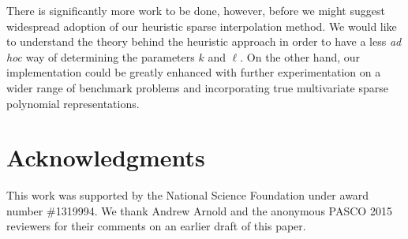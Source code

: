 \documentclass[letterpaper,10pt]{article}
\begin{document}
There is significantly more work to be done, however, before we might
suggest widespread adoption of our heuristic sparse interpolation
method. We would like to understand the theory behind the heuristic
approach in order to have a less \emph{ad hoc} way of determining the
parameters $k$ and $\ell$. On the other hand, our implementation could
be greatly enhanced with further experimentation on a wider range of
benchmark problems and incorporating true multivariate sparse polynomial
representations.



\section*{Acknowledgments}
This work was supported by the National Science Foundation under
award number \#1319994. We thank Andrew Arnold and the anonymous PASCO
2015 reviewers for their comments on an earlier draft of this paper.

\renewcommand{\bibpreamble}{\addcontentsline{toc}{section}{References}}

\end{document}
